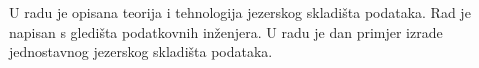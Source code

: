 \begin{sazetak}

U radu je opisana teorija i tehnologija jezerskog skladišta podataka. Rad je
napisan s gledišta podatkovnih inženjera. U radu je dan primjer
izrade jednostavnog jezerskog skladišta podataka.

\end{sazetak}